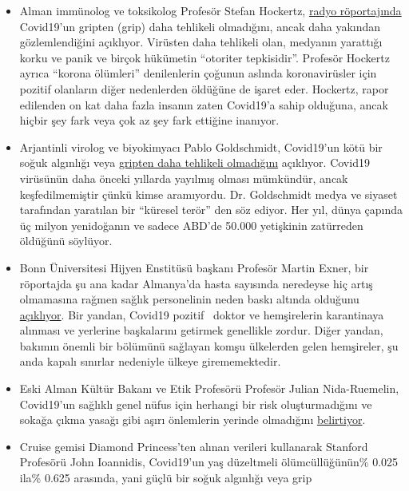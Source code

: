 \begin{itemize}
\tightlist
\item
  Alman immünolog ve toksikolog Profesör Stefan Hockertz,
  \href{https://www.youtube.com/watch?v=7wfb-B0BWmo}{radyo röportajında}
  Covid19'un gripten (grip) daha tehlikeli olmadığını, ancak daha
  yakından gözlemlendiğini açıklıyor. Virüsten daha tehlikeli olan,
  medyanın yarattığı korku ve panik ve birçok hükümetin ``otoriter
  tepkisidir''. Profesör Hockertz ayrıca ``korona ölümleri''
  denilenlerin çoğunun aslında koronavirüsler için pozitif olanların
  diğer nedenlerden öldüğüne de işaret eder. Hockertz, rapor edilenden
  on kat daha fazla insanın zaten Covid19'a sahip olduğuna, ancak hiçbir
  şey fark veya çok az şey fark ettiğine inanıyor. 
\item
  Arjantinli virolog ve biyokimyacı Pablo Goldschmidt, Covid19'un kötü
  bir soğuk algınlığı veya
  \href{https://www.clarin.com/buena-vida/coronavirus-panico-injustificado-dice-virologo-argentino-francia_0_yVcmJ4RM.html}{gripten
  daha tehlikeli olmadığını} açıklıyor. Covid19 virüsünün daha önceki
  yıllarda yayılmış olması mümkündür, ancak keşfedilmemiştir çünkü kimse
  aramıyordu. Dr. Goldschmidt medya ve siyaset tarafından yaratılan bir
  ``küresel terör'' den söz ediyor. Her yıl, dünya çapında üç milyon
  yenidoğanın ve sadece ABD'de 50.000 yetişkinin zatürreden öldüğünü
  söylüyor.
\item
  Bonn Üniversitesi Hijyen Enstitüsü başkanı Profesör Martin Exner, bir
  röportajda şu ana kadar Almanya'da hasta sayısında neredeyse hiç artış
  olmamasına rağmen sağlık personelinin neden baskı altında olduğunu
  \href{https://www.youtube.com/watch?v=9mI9trSm3PY}{açıklıyor}. Bir
  yandan, Covid19 pozitif~ doktor ve hemşirelerin karantinaya alınması
  ve yerlerine başkalarını getirmek genellikle zordur. Diğer yandan,
  bakımın önemli bir bölümünü sağlayan komşu ülkelerden gelen
  hemşireler, şu anda kapalı sınırlar nedeniyle ülkeye girememektedir.
\item
  Eski Alman Kültür Bakanı ve Etik Profesörü Profesör Julian
  Nida-Ruemelin, Covid19'un sağlıklı genel nüfus için herhangi bir risk
  oluşturmadığını ve sokağa çıkma yasağı gibi aşırı önlemlerin yerinde
  olmadığını
  \href{https://www.zdf.de/nachrichten/zdf-morgenmagazin/julian-nida-ruemelin-zur-corona-krise-100.html}{belirtiyor}.
\item
  Cruise gemisi Diamond Princess'ten alınan verileri kullanarak Stanford
  Profesörü John Ioannidis, Covid19'un yaş düzeltmeli ölümcüllüğünün\%
  0.025 ila\% 0.625 arasında, yani güçlü bir soğuk algınlığı veya grip

\end{itemize}
